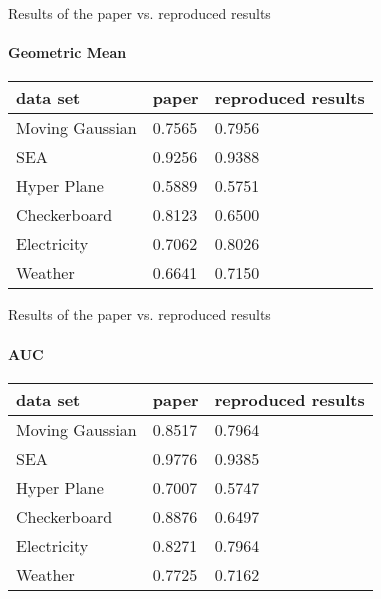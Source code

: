 
\begin{frame}{Results of the paper vs. reproduced results}
\framesubtitle{Geometric Mean}

\begin{table}[h]
    \centering
    \begin{tabular}{ | l | l | l | }
    \hline
    data set & paper & reproduced results \\ \hline \hline
    Moving Gaussian & 0.7565 & 0.7956 \\ \hline
    SEA & 0.9256 & 0.9388 \\ \hline
    Hyper Plane & 0.5889 & 0.5751 \\ \hline
    Checkerboard & 0.8123 & 0.6500 \\ \hline
    Electricity & 0.7062 & 0.8026 \\ \hline
    Weather & 0.6641 & 0.7150 \\ \hline
    \end{tabular}
\end{table}

\end{frame}


\begin{frame}{Results of the paper vs. reproduced results}
\framesubtitle{AUC}

\begin{table}[h]
    \centering
    \begin{tabular}{ | l | l | l | }
    \hline
    data set & paper & reproduced results \\ \hline \hline
    Moving Gaussian & 0.8517 & 0.7964 \\ \hline
    SEA & 0.9776 & 0.9385 \\ \hline
    Hyper Plane & 0.7007 & 0.5747 \\ \hline
    Checkerboard & 0.8876 & 0.6497 \\ \hline
    Electricity & 0.8271 & 0.7964 \\ \hline
    Weather & 0.7725 & 0.7162 \\ \hline
    \end{tabular}
\end{table}

\end{frame}

